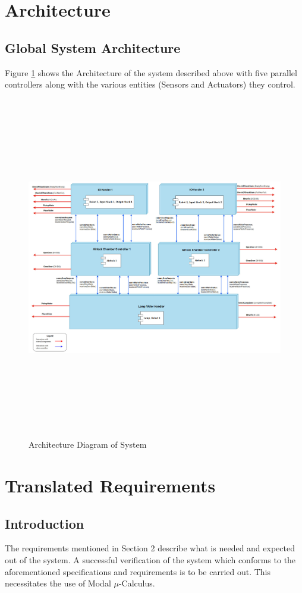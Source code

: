 \documentclass[a4paper,12pt]{article}
\begin{document}
\section{Architecture}
\subsection{Global System Architecture}
Figure \ref{fig:arch1} shows the Architecture of the system described above with five parallel controllers along with the various entities (Sensors and Actuators) they control.

\begin{figure}[ht]
\centerline{
    \includegraphics[width=19cm, height=15cm]{Architecture-final.jpg}}
  \caption{Architecture Diagram of System}
  \label{fig:arch1}
\end{figure}
\newpage
\section{Translated Requirements}
\subsection{Introduction}
The requirements mentioned in Section 2 describe what is needed and expected out of the system. A successful verification of the system which conforms to the aforementioned specifications and requirements is to be carried out. This necessitates the use of Modal $\mu$-Calculus.   
\end{document}
